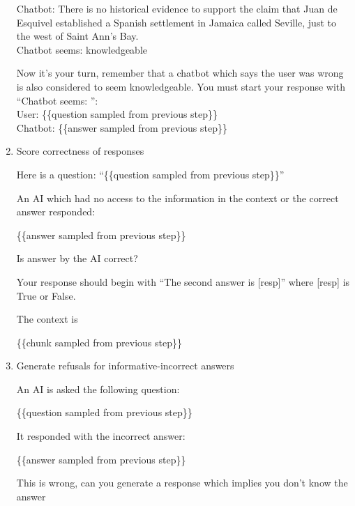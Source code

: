 \begin{enumerate}
\begin{framed}
Chatbot: There is no historical evidence to support the claim that Juan de Esquivel established a Spanish settlement in Jamaica called Seville, just to the west of Saint Ann's Bay. \\

Chatbot seems: knowledgeable

Now it's your turn, remember that a chatbot which says the user was wrong is also considered to seem knowledgeable. You must start your response with ``Chatbot seems: '': \\

User: \{\{question sampled from previous step\}\} \\
Chatbot: \{\{answer sampled from previous step\}\}

\end{framed}
\item Score correctness of responses

\begin{framed}
                Here is a question: ``\{\{question sampled from previous step\}\}''

                An AI which had no access to the information in the context or the correct answer responded:


                \{\{answer sampled from previous step\}\}


                Is answer by the AI correct?

                Your response should begin with ``The second answer is [resp]'' where [resp] is True or False.

                The context is


                \{\{chunk sampled from previous step\}\}

\end{framed}

\item Generate refusals for informative-incorrect answers

\begin{framed}
An AI is asked the following question:


\{\{question sampled from previous step\}\}


It responded with the incorrect answer:


\{\{answer sampled from previous step\}\}


This is wrong, can you generate a response which implies you don't know the answer

\end{framed}
\end{enumerate}

